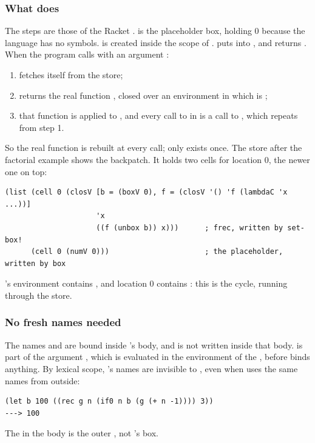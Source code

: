 \subsubsection{What  does} The steps are those of the Racket .  is the placeholder box, holding 0 because the language has no symbols.  is created inside the scope of .  puts  into , and  returns . When the program calls  with an argument :
\begin{enumerate}
  \item {} fetches  itself from the store;
  \item {} returns the real function , closed over an environment in which  is ;
  \item that function is applied to , and every call to  in  is a call to , which repeats from step 1.
\end{enumerate}
So the real function is rebuilt at every call; only  exists once. The store after the factorial example shows the backpatch. It holds two cells for location 0, the newer one on top:
\begin{lstlisting}[style=repl]
(list (cell 0 (closV [b = (boxV 0), f = (closV '() 'f (lambdaC 'x ...))]
                     'x
                     ((f (unbox b)) x)))      ; frec, written by set-box!
      (cell 0 (numV 0)))                      ; the placeholder, written by box
\end{lstlisting}
's environment contains , and location 0 contains : this is the cycle, running through the store.

\subsubsection{No fresh names needed} The names  and  are bound inside 's body, and  is not written inside that body.  is part of the argument , which is evaluated in the environment of the , before  binds anything. By lexical scope, 's names are invisible to , even when  uses the same names from outside:
\begin{lstlisting}[style=repl]
(let b 100 ((rec g n (if0 n b (g (+ n -1)))) 3))
---> 100
\end{lstlisting}
The  in the body is the outer , not 's box.

